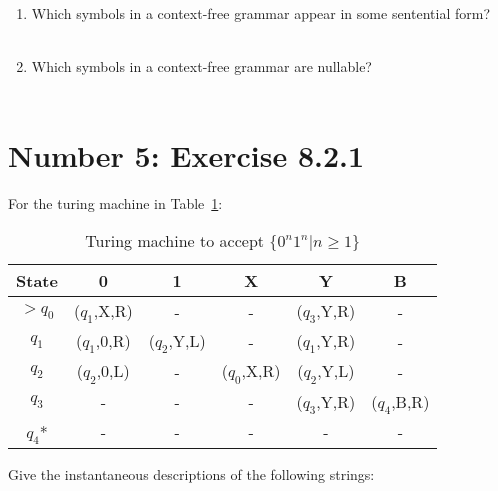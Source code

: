 \documentclass[12pt,a4paper,twoside]{article}  %
\begin{document}
\begin{enumerate}

\item Which symbols in a context-free grammar appear in some
  sentential form?
\\\\
\item Which symbols in a context-free grammar are nullable?
\\\\
\end{enumerate}

\section{Number 5: Exercise 8.2.1}

For the turing machine in Table~\ref{8.2.1}:
\begin{table}
\label{8.2.1}
\begin{tabular}{c | c c c c c}
State  &0          &1            &X           &Y           &B \\
\hline\hline
$>q_0$ &($q_1$,X,R) &-           &-           &($q_3$,Y,R) &- \\
$q_1$  &($q_1$,0,R) &($q_2$,Y,L) &-           &($q_1$,Y,R) &- \\
$q_2$  &($q_2$,0,L) &-           &($q_0$,X,R) &($q_2$,Y,L) &- \\
$q_3$  &-           &-           &-           &($q_3$,Y,R) &($q_4$,B,R) \\
$q_4$* &-           &-           &-           &-           &-
\end{tabular}
\caption{Turing machine to accept $\{0^n1^n | n \geq 1\}$}
\end{table}

Give the instantaneous descriptions of the following strings:
\end{document}
